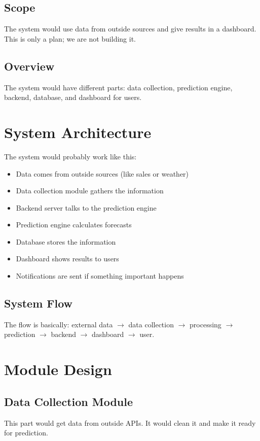 \documentclass[12pt]{report}
\begin{document}
\subsection{Scope}
The system would use data from outside sources and give results in a dashboard. This is only a plan; we are not building it.

\subsection{Overview}
The system would have different parts: data collection, prediction engine, backend, database, and dashboard for users.


\section{System Architecture}

The system would probably work like this:

\begin{itemize}
    \item Data comes from outside sources (like sales or weather)
    \item Data collection module gathers the information
    \item Backend server talks to the prediction engine
    \item Prediction engine calculates forecasts
    \item Database stores the information
    \item Dashboard shows results to users
    \item Notifications are sent if something important happens
\end{itemize}

\subsection{System Flow}
The flow is basically: external data $\rightarrow$ data collection $\rightarrow$ processing $\rightarrow$ prediction $\rightarrow$ backend $\rightarrow$ dashboard $\rightarrow$ user.


\section{Module Design}

\subsection{Data Collection Module}
This part would get data from outside APIs. It would clean it and make it ready for prediction.
\end{document}
